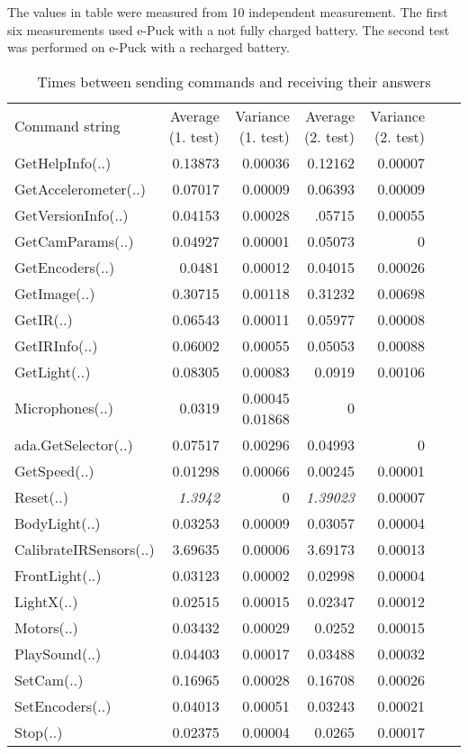 	The values in table were measured from 10 independent measurement. 
	The first six measurements used e-Puck with a not fully charged battery.
	The second test was performed on e-Puck with a recharged battery.


\begin{table}[!hbp]
\begin{tabular}{lrrrrrr}
Command string & {\small Average (1. test)}  & {\small Variance (1. test)}& {\small Average (2. test)} & {\small Variance (2. test)}\\
GetHelpInfo(..)& 0.13873 & 0.00036& 0.12162&0.00007\\
GetAccelerometer(..)&0.07017&0.00009&  0.06393&0.00009\\ 
GetVersionInfo(..)&0.04153&0.00028&.05715&0.00055\\ 
GetCamParams(..)&0.04927&0.00001&  0.05073&0\\ 
GetEncoders(..)&0.0481&0.00012&  0.04015&0.00026\\ 
GetImage(..)&0.30715 &0.00118& 0.31232&0.00698\\ 
GetIR(..)&0.06543 &0.00011&0.05977&0.00008\\ 
GetIRInfo(..)&0.06002 &0.00055& 0.05053&0.00088\\
GetLight(..)&0.08305 &0.00083&0.0919&0.00106\\
Microphones(..)& 0.0319&0.00045 0.01868&0\\
ada.GetSelector(..)& 0.07517&0.00296& 0.04993& 0\\
GetSpeed(..)& 0.01298&0.00066&   0.00245&0.00001\\
Reset(..) &{\it 1.3942} & 0 &{\it 1.39023} &0.00007 \\
BodyLight(..)& 0.03253&0.00009&   0.03057&0.00004\\
CalibrateIRSensors(..)&3.69635&0.00006&3.69173&0.00013\\
FrontLight(..)&0.03123&0.00002 & 0.02998&0.00004\\
LightX(..)& 0.02515&0.00015&  0.02347&0.00012\\
Motors(..)&0.03432&0.00029&  0.0252&0.00015\\
PlaySound(..)& 0.04403& 0.00017&  0.03488&0.00032\\
SetCam(..)& 0.16965& 0.00028& 0.16708&0.00026\\
SetEncoders(..)& 0.04013&0.00051& 0.03243&0.00021\\
Stop(..)&0.02375&0.00004&  0.0265&0.00017\\
\end{tabular}
\caption{Times between sending commands and receiving their answers}
\label{times1}
\end{table}

